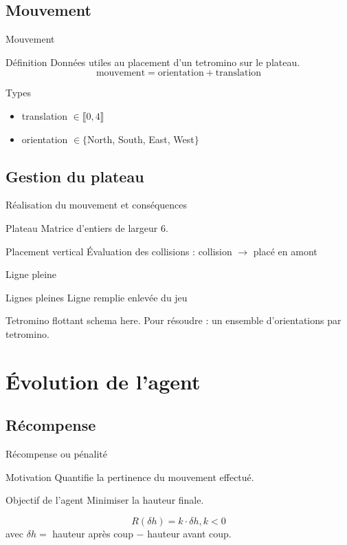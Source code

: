 \documentclass[tikz, footheight=2em]{beamer}
\begin{document}
\subsection{Mouvement}
\begin{frame}[c]{Mouvement}
  \begin{block}{Définition}
    Données utiles au placement d'un tetromino sur le plateau.
    \pause{}
    \[ \text{mouvement} = \text{orientation} + \text{translation} \]
  \end{block}
  \pause{}
  \begin{block}{Types}
    \begin{itemize}
      \item translation \(\in \llbracket 0, 4 \rrbracket\)
      \item orientation \(\in \{\)North, South, East, West\(\}\)
    \end{itemize}
  \end{block}
\end{frame}

\subsection{Gestion du plateau}
\begin{frame}[c]{Réalisation du mouvement et conséquences}
  \begin{block}{Plateau}
    Matrice d'entiers de largeur 6.
  \end{block}
  \begin{block}{Placement vertical}
    Évaluation des collisions : collision \(\rightarrow\) placé en amont
  \end{block}
\end{frame}
\begin{frame}[c]{Ligne pleine}
  \begin{block}{Lignes pleines}
    Ligne remplie enlevée du jeu
  \end{block}
  \begin{alertblock}{Tetromino flottant}
    schema here. Pour résoudre : un ensemble d'orientations par tetromino.
  \end{alertblock}
\end{frame}

\section{Évolution de l'agent}
\subsection{Récompense}
\begin{frame}[c]{Récompense ou pénalité}
  \begin{block}{Motivation}
    Quantifie la pertinence du mouvement effectué.
  \end{block}
  \pause{}
  \begin{block}{Objectif de l'agent}
    Minimiser la hauteur finale.
  \end{block}
  \pause{}
  \[ R(\delta h) = k \cdot \delta h, k < 0 \]
  avec \(\delta h =\) hauteur après coup \(-\) hauteur avant coup.
\end{frame}
\end{document}

